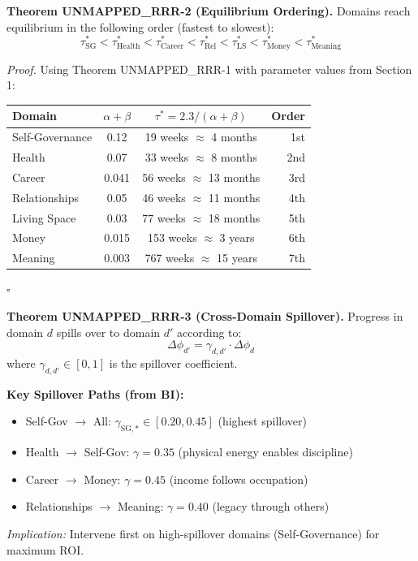 \begin{tcolorbox}[colback=green!5!white, colframe=green!75!black, title=Theorem UNMAPPED_RRR-2: Domain Equilibrium Ordering]
\textbf{Theorem UNMAPPED_RRR-2 (Equilibrium Ordering).}
Domains reach equilibrium in the following order (fastest to slowest):
\begin{equation}
\tau^*_{\text{SG}} < \tau^*_{\text{Health}} < \tau^*_{\text{Career}} < \tau^*_{\text{Rel}} < \tau^*_{\text{LS}} < \tau^*_{\text{Money}} < \tau^*_{\text{Meaning}}
\end{equation}

\textit{Proof.}
Using Theorem UNMAPPED_RRR-1 with parameter values from Section 1:
\begin{center}
\small
\begin{tabular}{@{}lccr@{}}
\toprule
\textbf{Domain} & $\alpha + \beta$ & $\tau^* = 2.3/(\alpha+\beta)$ & \textbf{Order} \\
\midrule
Self-Governance & 0.12 & 19 weeks $\approx$ 4 months & 1st \\
Health & 0.07 & 33 weeks $\approx$ 8 months & 2nd \\
Career & 0.041 & 56 weeks $\approx$ 13 months & 3rd \\
Relationships & 0.05 & 46 weeks $\approx$ 11 months & 4th \\
Living Space & 0.03 & 77 weeks $\approx$ 18 months & 5th \\
Money & 0.015 & 153 weeks $\approx$ 3 years & 6th \\
Meaning & 0.003 & 767 weeks $\approx$ 15 years & 7th \\
\bottomrule
\end{tabular}
\end{center}
\hfill $\square$
\end{tcolorbox}

\begin{tcolorbox}[colback=green!5!white, colframe=green!75!black, title=Theorem UNMAPPED_RRR-3: Cross-Domain Spillover]
\textbf{Theorem UNMAPPED_RRR-3 (Cross-Domain Spillover).}
Progress in domain $d$ spills over to domain $d'$ according to:
\begin{equation}
\Delta \phi_{d'} = \gamma_{d,d'} \cdot \Delta \phi_d
\end{equation}
where $\gamma_{d,d'} \in [0,1]$ is the spillover coefficient.

\textbf{Key Spillover Paths (from BI):}
\begin{itemize}[nosep]
\item Self-Gov $\rightarrow$ All: $\gamma_{\text{SG},*} \in [0.20, 0.45]$ (highest spillover)
\item Health $\rightarrow$ Self-Gov: $\gamma = 0.35$ (physical energy enables discipline)
\item Career $\rightarrow$ Money: $\gamma = 0.45$ (income follows occupation)
\item Relationships $\rightarrow$ Meaning: $\gamma = 0.40$ (legacy through others)
\end{itemize}

\textit{Implication:} Intervene first on high-spillover domains (Self-Governance) for maximum ROI.
\end{tcolorbox}

